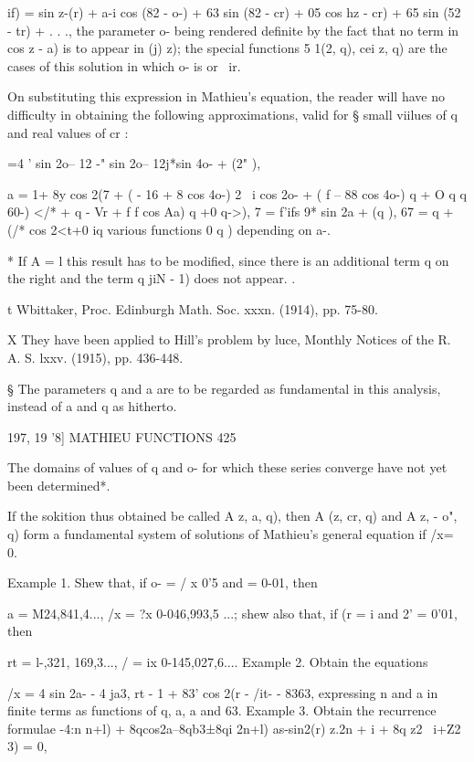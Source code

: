 {{  if) = sin z-(r) + a-i cos (82 - o-) + 63 sin (82 - cr) + 05 cos hz -
cr) + 65 sin (52 - tr) + . . ., the parameter o- being rendered
definite by the fact that no term in cos z - a) is to appear in (j)
z); the special functions 5 1(2, q), cei z, q) are the cases of this
solution in which o- is or \ ir.

On substituting this expression in Mathieu's equation, the reader will
have no difficulty in obtaining the following approximations, valid
for § small viilues of q and real values of cr :

  =4 ' sin 2o-- 12 -" sin 2o-- 12j*sin 4o- + (2" ),

a = 1+ 8y cos 2(7 + ( - 16 + 8 cos 4o-) 2 \ i cos 2o- + ( f -- 88 cos
4o-) q + O q%
q%
60-) </* + q%
- Vr + f f cos Aa) q +0 q->), 7 = f'ifs 9* sin 2a + (q ), 67 = q + (/*
cos 2<t+0 iq%
various functions 0 q ) depending on a-.

* If A = l this result has to be modified, since there is an
additional term q on the right and the term q jiN - 1) does not
appear. .

t Wbittaker, Proc. Edinburgh Math. Soc. xxxn. (1914), pp. 75-80.

X They have been applied to Hill's problem by luce, Monthly Notices of
the R. A. S. lxxv. (1915), pp. 436-448.

§ The parameters q and a are to be regarded as fundamental in this
analysis, instead of a and q as hitherto.

197, 19 '8] MATHIEU FUNCTIONS 425

The domains of values of q and o- for which these series converge have
not yet been determined*.

If the sokition thus obtained be called A z, a, q), then A (z, cr, q)
and A z, - o", q) form a fundamental system of solutions of Mathieu's
general equation if /x= 0.

Example 1. Shew that, if o- = / x 0'5 and = 0-01, then

a = M24,841,4..., /x = ?x 0-046,993,5 ...; shew also that, if (r = i
and 2' = 0'01, then

rt = l-,321, 169,3..., / = ix 0-145,027,6.... Example 2. Obtain the
equations

/x = 4 sin 2a- - 4 ja3, rt - 1 + 83' cos 2(r - /it- - 8363,
expressing n and a in finite terms as functions of q, a, a and 63.
Example 3. Obtain the recurrence formulae -4:n n+l) +
8qcos2a--8qb3±8qi 2n+l) as-sin2(r) z.2n + i + 8q z2 \ i+Z2 3) = 0,

}}

